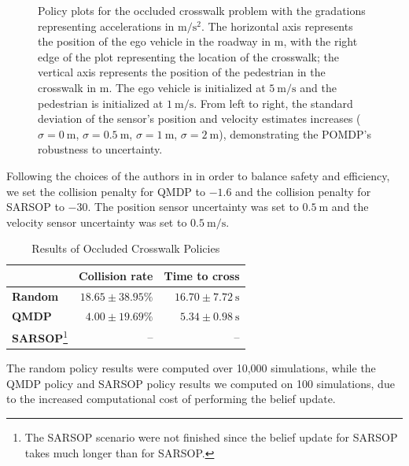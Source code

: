 \documentclass[conference]{IEEEtran}
\begin{document}
\begin{figure}[htbp]
{    }
    \caption{Policy plots for the occluded crosswalk problem with the gradations representing accelerations in $\si{\meter\per\square\second}$. The horizontal axis represents the position of the ego vehicle in the roadway in $\si{\meter}$, with the right edge of the plot representing the location of the crosswalk; the vertical axis represents the position of the pedestrian in the crosswalk in $\si{\meter}$. The ego vehicle is initialized at $5 ~\si{\meter\per\second}$ and the pedestrian is initialized at $1 ~\si{\meter\per\second}$. From left to right, the standard deviation of the sensor's position and velocity estimates increases ($\sigma = 0~ \si{\meter}$, $\sigma = 0.5~ \si{\meter}$, $\sigma = 1~ \si{\meter}$, $\sigma = 2~ \si{\meter}$), demonstrating the POMDP's robustness to uncertainty.}
    \label{fig:qmdp_sarsop_2}
\end{figure}


Following the choices of the authors in \cite{Bouton2018ScalableDriving} in order to balance safety and efficiency, we set the collision penalty for QMDP to $-1.6$ and the collision penalty for SARSOP to $-30$. The position sensor uncertainty was set to $0.5 ~\si{\meter}$ and the velocity sensor uncertainty was set to $0.5 ~\si{\meter\per\second}$.

\begin{table}[htbp]
    \caption{Results of Occluded Crosswalk Policies}
    \begin{center}
        \begin{tabular}{lrr}
            \hline \hline
             & \textbf{Collision rate} \hspace{3pt} & \textbf{Time to cross} \hspace{1pt} \\
            \hline
            \textbf{Random} & $18.65 \pm 38.95\%$ & $16.70 \pm 7.72 ~\si{\second}$ \\
            \textbf{QMDP}   & $4.00 \pm 19.69\%$  & $5.34 \pm 0.98 ~\si{\second}$ \\
            \textbf{SARSOP}\footnote{The SARSOP scenario were not finished since the belief update for SARSOP takes much longer than for SARSOP.} & -- & -- \\
            \hline \hline
        \end{tabular}
        \label{tab1}
    \end{center}
\end{table}

The random policy results were computed over 10,000 simulations, while the QMDP policy and SARSOP policy results we computed on 100 simulations, due to the increased computational cost of performing the belief update.
\end{document}
